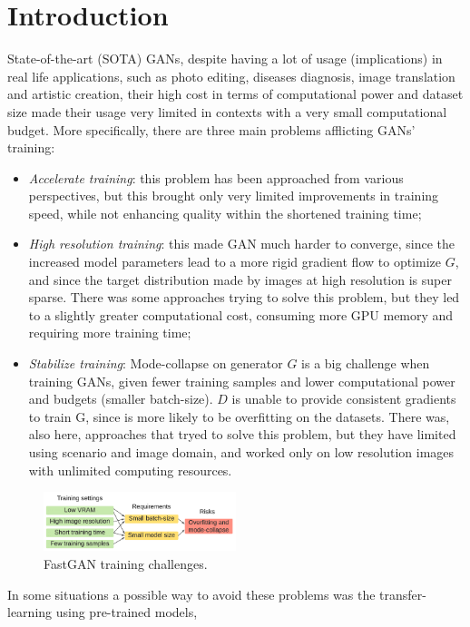 \documentclass[12pt]{article}
\begin{document}
\section{Introduction}
\large
	State-of-the-art (SOTA) GANs, despite having a lot of usage (implications) in real life applications, 
	such as photo editing, diseases diagnosis, image translation and artistic creation, their high cost in 
	terms of computational power and dataset size made their usage very limited in contexts with a very small
	computational budget. More specifically, there are three main problems afflicting GANs' training:
	\begin{itemize}
		\setlength\itemsep{0.01em}
		\item \textit{Accelerate training}: this problem has been approached from various perspectives, but this brought
			  only very limited improvements in training speed, while not enhancing quality within the shortened training time;
		\item \textit{High resolution training}: this made GAN much harder to converge, since the increased model parameters
			  lead to a more rigid gradient flow to optimize $G$, and since the target distribution made by images at high resolution
			  is super sparse. There was some approaches trying to solve this problem, but they led to a slightly greater computational
			  cost, consuming more GPU memory and requiring more training time;
		\item \textit{Stabilize training}: Mode-collapse on generator $G$ is a big challenge when training GANs, given fewer training
			  samples and lower computational power and budgets (smaller batch-size). $D$ is unable to provide consistent gradients to 
			  train G, since is more likely to be overfitting on the datasets. There was, also here, approaches that tryed to solve this 
			  problem, but they have limited using scenario and image domain, and worked only on low resolution images with unlimited computing
			  resources.
	\end{itemize}
	\begin{figure}[H]
		\centering
		\includegraphics[width=0.5\textwidth]{Images/problems.png}
		\caption{FastGAN training challenges.} 
	\end{figure}
	In some situations a possible way to avoid these problems was the transfer-learning using pre-trained models,
\end{document}
